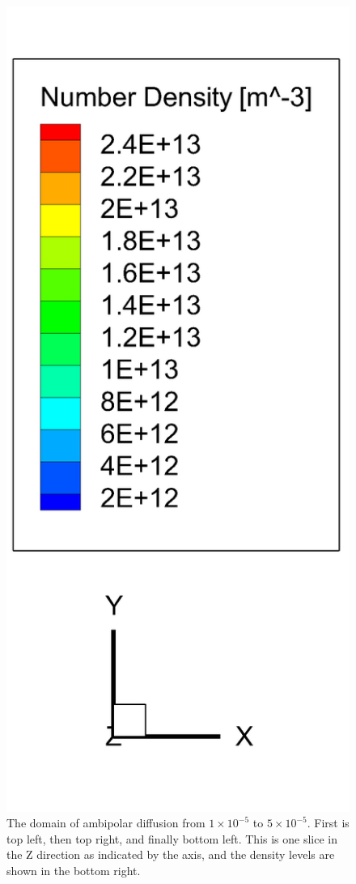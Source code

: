 \begin{figure}
\begin{minipage}[b]{0.2\textwidth}
    \includegraphics[width=\textwidth]{figures/legend.png}
  \end{minipage}
  \caption[Ambipolar Diffusion Density]{The domain of ambipolar diffusion from \(1\times10^{-5}\) to \(5\times10^{-5}\). First is top left, then top right, and finally bottom left. This is one slice in the Z direction as indicated by the axis, and the density levels are shown in the bottom right.}
  \label{fig:ambidiff}
\end{figure}


